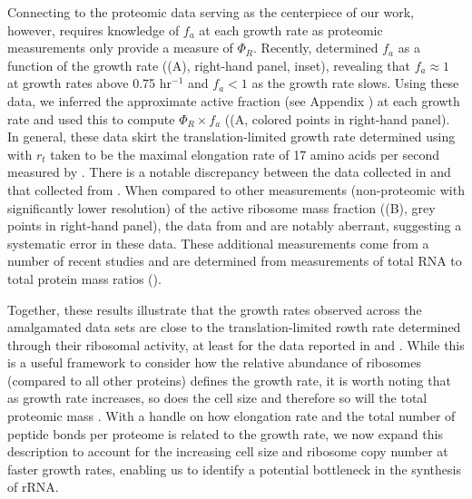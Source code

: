 Connecting  to the proteomic data serving as the centerpiece of
our work, however, requires knowledge
of $f_a$ at each growth rate as proteomic measurements only provide a
measure of $\Phi_R$. Recently, \cite{dai2016} determined $f_a$ as a function of
the growth rate ((A), right-hand panel, inset), revealing
that $f_a \approx 1$ at growth rates above 0.75 hr$^{-1}$ and $f_a < 1$ as the
growth rate slows. Using these data, we inferred the approximate active fraction
(see Appendix ) at each growth rate and used this to compute
$\Phi_R \times f_a$ ((A, colored points in right-hand
panel). In general, these data skirt the translation-limited growth rate
determined using  with $r_t$ taken to be the maximal elongation
rate of 17 amino acids per second measured by \cite{dai2016}. There is a notable
discrepancy between the data collected in \cite{schmidt2016, li2014} and that
collected from \cite{valgepea2013, peebo2015}. When compared to other
measurements (non-proteomic with significantly lower resolution) of the active ribosome mass fraction
((B), grey points in right-hand panel), the data from
\cite{valgepea2013} and \cite{peebo2015} are notably aberrant, suggesting a
systematic error in these data. These additional measurements come from a number
of recent studies and are determined from measurements of total RNA to total
protein mass ratios ().

Together, these results illustrate that the growth rates observed across the
amalgamated data sets are close to the translation-limited rowth rate determined through their
ribosomal activity, at least for the data reported in \cite{schmidt2016} and
\cite{li2014}. While this is a useful framework to consider how the relative
abundance of ribosomes (compared to all other proteins) defines the growth rate,
it is worth noting that as growth rate increases, so does the cell size and
therefore so will the total proteomic mass \citep{basan2015}. With a handle on
how elongation rate and the total number of peptide bonds per proteome is
related to the growth rate, we now expand this description to account for the
increasing cell size and ribosome copy number at faster growth rates,  enabling
us to identify a potential bottleneck in the synthesis of rRNA.

